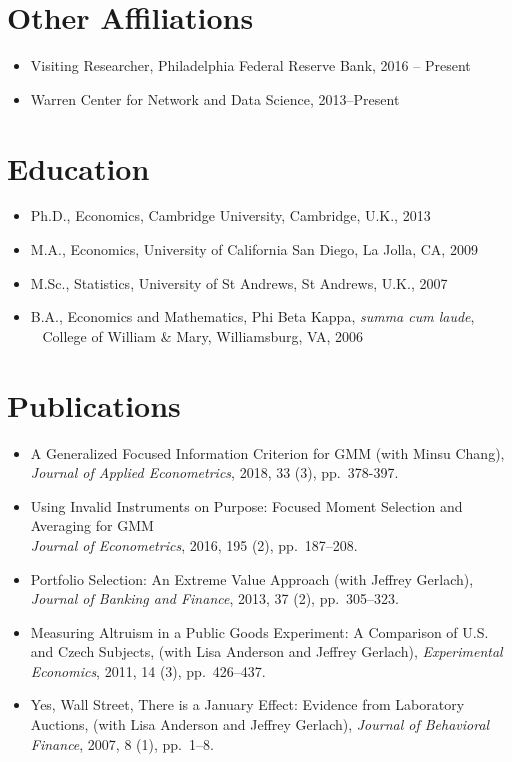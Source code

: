 \documentclass[line,overlapped]{myres}
\begin{document}
\begin{resume}
\section{\sc Other Affiliations}
\begin{itemize}
\item Visiting Researcher, Philadelphia Federal Reserve Bank, 2016 -- Present
\item Warren Center for Network and Data Science, 2013--Present
\end{itemize}

\section{\sc Education}
\begin{itemize}
\item Ph.D., Economics, Cambridge University, Cambridge, U.K., 2013
\item M.A., Economics, University of California San Diego, La Jolla, CA, 2009
\item M.Sc., Statistics, University of St Andrews, St Andrews, U.K., 2007
\item B.A., Economics and Mathematics, Phi Beta Kappa, \emph{summa cum laude},\\ 
  \-\ \hspace{1em} College of William \& Mary, Williamsburg, VA, 2006
\end{itemize}




\section{\sc Publications}
\begin{itemize}
  \item A Generalized Focused Information Criterion for GMM (with Minsu Chang), \emph{Journal of Applied Econometrics}, 2018, 33 (3), pp.\ 378-397.
  \item Using Invalid Instruments on Purpose: Focused Moment Selection and Averaging for GMM\\ \emph{Journal of Econometrics}, 2016, 195 (2), pp.\ 187--208.
	\item Portfolio Selection: An Extreme Value Approach (with Jeffrey Gerlach), \emph{Journal of Banking and Finance}, 2013, 37 (2), pp.\ 305--323.
	\item Measuring Altruism in a Public Goods Experiment:  A Comparison of U.S. and Czech Subjects, (with Lisa Anderson and Jeffrey Gerlach), \emph{Experimental Economics}, 2011, 14 (3), pp.\ 426--437.
	\item Yes, Wall Street, There is a January Effect: Evidence from Laboratory Auctions, (with Lisa Anderson and Jeffrey Gerlach), \emph{Journal of Behavioral Finance}, 2007, 8 (1), pp.\ 1--8. 
\end{itemize}



\end{resume}
\end{document}
